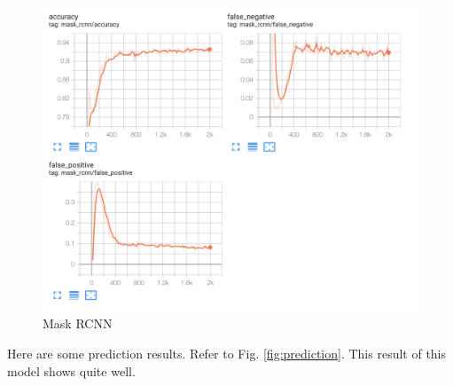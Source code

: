 \documentclass[conference]{IEEEtran}
\begin{document}
\begin{figure}[h!]
    \centering
    \includegraphics[width=\linewidth]{img/ap_maskrcnn.png}
    \caption{Mask RCNN}
    \label{fig_ap}
\end{figure}

Here are some prediction results. Refer to Fig. \ref{fig:prediction}.
This result of this model shows quite well. 
\end{document}
